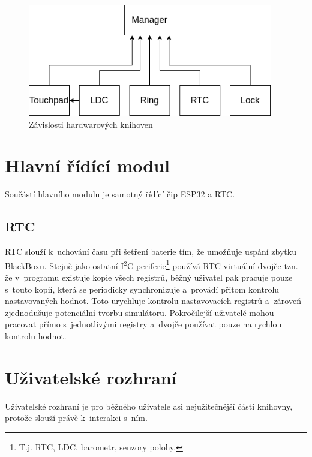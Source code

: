 \begin{figure}[h]
    \begin{small}
        \begin{center}
            \includegraphics[width=0.95\textwidth]{img/manager.png}
        \end{center}
        \caption{Závislosti hardwarových knihoven}
        \label{fig:hLibs}
    \end{small}
\end{figure}

\section{Hlavní řídící modul}

Součástí hlavního modulu je samotný řídící čip ESP32 a RTC.

\subsection{RTC}\label{ss:rtc}

RTC slouží k~uchování času při šetření baterie tím, že umožňuje uspání zbytku BlackBoxu.
Stejně jako ostatní I$^2$C periferie\footnote{T.j. RTC, LDC, barometr, senzory polohy.} používá RTC virtuální dvojče tzn. že v~programu existuje kopie všech registrů, běžný uživatel pak pracuje pouze s~touto kopií, která se periodicky synchronizuje a~provádí přitom kontrolu nastavovaných hodnot.
Toto urychluje kontrolu nastavovacích registrů a~zároveň zjednodušuje potenciální tvorbu simulátoru.
Pokročilejší uživatelé mohou pracovat přímo s~jednotlivými registry a~dvojče používat pouze na rychlou kontrolu hodnot.

\section{Uživatelské rozhraní}

Uživatelské rozhraní je pro běžného uživatele asi nejužitečnější části knihovny, protože slouží právě k~interakci s~ním.

